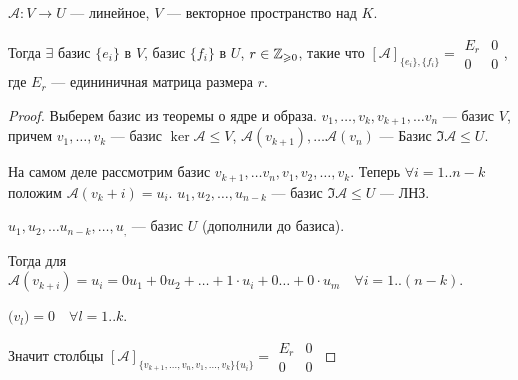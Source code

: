 \begin{theorem}
    $\mathcal{A}\!: V \to U$ --- линейное,  $V$ --- векторное пространство над  $K$. 

    Тогда $\exists$ базис $\{e_i\}$ в  $V$, базис  $\{f_i\}$ в  $U$,  $r \in \mathbb{Z}_{\geqslant 0}$, такие что $[\mathcal{A}]_{\{e_i\}, \{f_i\}} = \begin{array}{|c|c|} E_r & 0 \\ \hline 0 & 0 \end{array}$, где $E_r$ --- едининичная матрица размера  $r$.
\end{theorem}
\begin{proof}
    Выберем базис из теоремы о ядре и образа. $v_1, \ldots, v_k, v_{k+1}, \ldots v_n$ --- базис $V$, причем  $v_1, \ldots, v_k$ --- базис $\ker \mathcal{A} \le V$,  $\mathcal{A}(v_{k+1}), \ldots \mathcal{A}(v_n)$ --- Базис $\Im \mathcal{A} \le U$.

    На самом деле рассмотрим базис $v_{k+1}, \ldots v_n, v_1, v_2, \ldots, v_k$. Теперь $\forall i = 1..n - k$ положим $\mathcal{A}(v_k + i) = u_i$.  $u_1, u_2, \ldots, u_{n-k}$ --- базис $\Im \mathcal{A} \le U$ --- ЛНЗ.

    $u_1, u_2, \ldots u_{n-k}, \ldots, u_,$ --- базис $U$ (дополнили до базиса). 

    Тогда для  $\mathcal{A}(v_{k+i}) = u_i = 0 u_1 + 0 u_2 + \ldots + 1 \cdot u_i + 0 \ldots + 0 \cdot u_m\quad \forall i = 1..(n-k)$.

    $\mathcal(v_l) = 0 \quad \forall l=1..k$.

    Значит столбцы  $[\mathcal{A}]_{\{v_{k+1}, \ldots, v_n, v_1,\ldots, v_k\} \{u_i\}} =  \begin{array}{|c|c|} E_r & 0 \\ \hline 0 & 0 \end{array}$
\end{proof}


